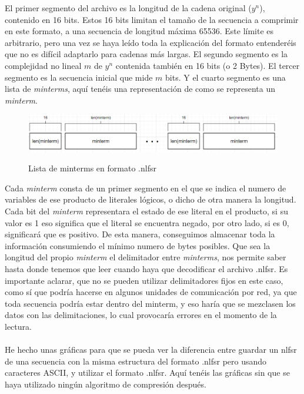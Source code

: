 \noindent El primer segmento del archivo es la longitud de la cadena original ($y^n$), contenido en 16 bits. Estos 16 bits limitan el tamaño de la secuencia a comprimir en este formato, a una secuencia de longitud máxima 65536. Este límite es arbitrario, pero una vez se haya leído toda la explicación del formato entenderéis que no es difícil adaptarlo para cadenas más largas.  El segundo segmento es la complejidad no lineal $m$ de $y^n$ contenida también en 16 bits (o 2 Bytes). El tercer segmento es la secuencia inicial que mide $m$ bits. Y el cuarto segmento es una lista de \textit{minterms}, aquí tenéis una representación de como se representa un \textit{minterm}.
\\
\begin{figure}[h] %
    \centering
    \includegraphics[width=\textwidth,keepaspectratio]{img/nlfsrformat_02.png} %
    \parbox{\linewidth}{\centering Lista de minterms en formato .nlfsr}
    \label{fig:mi_imagen} %
\end{figure}
\noindent Cada \textit{minterm} consta de un primer segmento en el que se indica el numero de variables de ese producto de literales lógicos, o dicho de otra manera la longitud. Cada bit del \textit{minterm} representara el estado de ese literal en el producto, si su valor es 1 eso significa que el literal se encuentra negado, por otro lado, si es 0, significará que es positivo. De esta manera, conseguimos almacenar toda la información consumiendo el mínimo numero de bytes posibles. Que sea la longitud del propio \textit{minterm} el delimitador entre \textit{minterms}, nos permite saber hasta donde tenemos que leer cuando haya que decodificar el archivo .nlfsr. Es importante aclarar, que no se pueden utilizar delimitadores fijos en este caso, como sí que podría hacerse en algunos unidades de comunicación por red, ya que toda secuencia podría estar dentro del minterm, y eso haría que se mezclasen los datos con las delimitaciones, lo cual provocaría errores en el momento de la lectura.
\\\\
\newpage
He hecho unas gráficas para que se pueda ver la diferencia entre guardar un nlfsr de una secuencia con la misma estructura del formato .nlfsr pero usando caracteres ASCII, y utilizar el formato .nlfsr. Aquí tenéis las gráficas sin que se haya utilizado ningún algoritmo de compresión después. 
